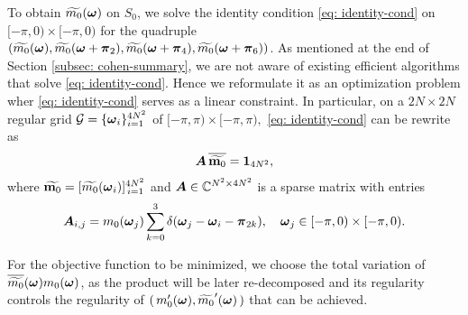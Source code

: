 To obtain $\widetilde{m_{0}}(\boldsymbol{\omega})$ on $S_0$, we solve the identity condition \eqref{eq: identity-cond} on $[-\pi, 0)\times[-\pi, 0 )$ for the quadruple $(\widetilde{m_{0}}(\boldsymbol{\omega}), \widetilde{m_{0}}(\boldsymbol{\omega}+\boldsymbol{\pi}_{2}), \widetilde{m_{0}}(\boldsymbol{\omega}+\boldsymbol{\pi}_{4}), \widetilde{m_{0}}(\boldsymbol{\omega}+\boldsymbol{\pi}_{6}))$. As mentioned at the end of Section \ref{subsec: cohen-summary}, we are not aware of existing efficient algorithms that solve \eqref{eq: identity-cond}. Hence we reformulate it as an optimization problem wher \eqref{eq: identity-cond} serves as a linear constraint. In particular, on a $2N\times 2N$ regular grid $\mathcal{G}=\{\boldsymbol{\omega}_i\}_{i=1}^{4N^2}$ of $[-\pi, \pi)\times[-\pi, \pi), $ \eqref{eq: identity-cond} can be rewrite as
\begin{align}
\V{A}\, \overline{\widetilde{\mathbf{m}_0}}= \mathbf{1}_{4N^2}, \label{eq: m0-A}%
\end{align}
where $\widetilde{\mathbf{m}_0} = [\widetilde{m_0}(\boldsymbol{\omega}_i)]_{\,i=1}^{4N^2}$ and $\boldsymbol{A}\in \mathbb{C}^{N^2\times 4N^2}$ is a sparse matrix with entries 
$$\boldsymbol{A}_{i,j} = m_0(\boldsymbol{\omega}_j)\sum_{k=0}^3\delta(\boldsymbol{\omega}_j-\boldsymbol{\omega}_i-\boldsymbol{\pi}_{2k}), \quad \boldsymbol{\omega}_j \in [-\pi,0)\times[-\pi,0).$$

For the objective function to be minimized, we choose the total variation of $\overline{\widetilde{m_{0}}}(\boldsymbol{\omega})m_0(\boldsymbol{\omega})$, as the product will be later re-decomposed and its regularity controls the regularity of $(\,m_0'(\boldsymbol{\omega}), \widetilde{m_0}'(\boldsymbol{\omega})\,)$ that can be achieved.

